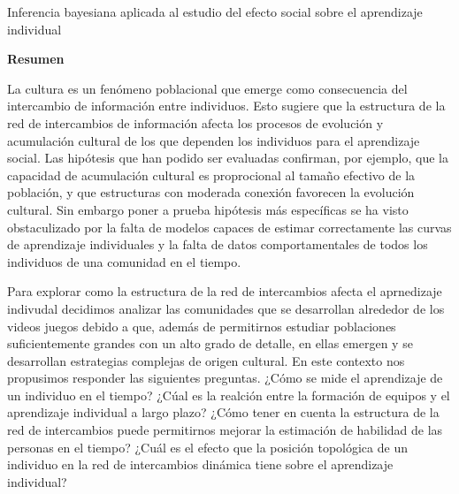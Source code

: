 \documentclass[a4paper,10pt]{book}
\theoremstyle{definition}
\newcommand{\TITULO}[0]{Inferencia bayesiana aplicada al estudio del efecto social sobre el aprendizaje individual}
\begin{document}
\newpage

\begin{center}
\Large \TITULO \normalsize
\end{center}

\hspace{2cm}

\begin{center}
\textbf{Resumen}
\end{center}



La cultura es un fen\'omeno poblacional que emerge como consecuencia del intercambio de informaci\'on entre individuos.
%
Esto sugiere que la estructura de la red de intercambios de información afecta los procesos de evolución y acumulaci\'on cultural de los que dependen los individuos para el aprendizaje social.
%
Las hipótesis que han podido ser evaluadas confirman, por ejemplo, que la capacidad de acumulación cultural es proprocional al tamaño efectivo de la población, y que estructuras con moderada conexión favorecen la evolución cultural.
%
Sin embargo poner a prueba hipótesis más específicas se ha visto obstaculizado por la falta de modelos capaces de estimar correctamente las curvas de aprendizaje individuales y la falta de datos comportamentales de todos los individuos de una comunidad en el tiempo.


Para explorar como la estructura de la red de intercambios afecta el aprnedizaje indivudal decidimos analizar las comunidades que se desarrollan alrededor de los videos juegos debido a que, además de permitirnos estudiar poblaciones suficientemente grandes con un alto grado de detalle, en ellas emergen y se desarrollan estrategias complejas de origen cultural.
%
En este contexto nos propusimos responder las siguientes preguntas.
%
¿Cómo se mide el aprendizaje de un individuo en el tiempo?
%
¿C\'ual es la realción entre la formaci\'on de equipos y el aprendizaje individual a largo plazo?
%
¿Cómo tener en cuenta la estructura de la red de intercambios puede permitirnos mejorar la estimación de habilidad de las personas en el tiempo?
%
¿Cu\'al es el efecto que la posici\'on topológica de un individuo en la red de intercambios dinámica tiene sobre el aprendizaje individual?
\end{document}
